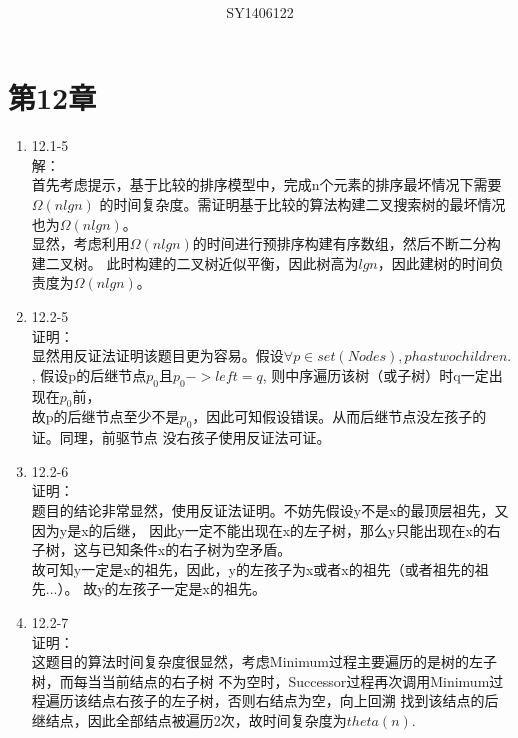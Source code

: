 \documentclass[UTF8]{ctexart}
\begin{document}
\title{\\}
\vspace{2cm}
\author{\\SY1406122}
\date{}
\maketitle

\section*{第12章}
\begin{enumerate}
    \item 12.1-5 \\
    解：\\
        首先考虑提示，基于比较的排序模型中，完成n个元素的排序最坏情况下需要$\Omega(nlgn)$
		的时间复杂度。需证明基于比较的算法构建二叉搜索树的最坏情况也为$\Omega(nlgn)$。\\
		显然，考虑利用$\Omega(nlgn)$的时间进行预排序构建有序数组，然后不断二分构建二叉树。
		此时构建的二叉树近似平衡，因此树高为$lgn$，因此建树的时间负责度为$\Omega(nlgn)$。\\
	
	\item 12.2-5 \\
	证明：\\
		显然用反证法证明该题目更为容易。假设$\forall p \in set(Nodes), p has two children.$,
		假设p的后继节点$p_0$且$p_0->left = q$, 则中序遍历该树（或子树）时q一定出现在$p_0$前，\\
		故p的后继节点至少不是$p_0$，因此可知假设错误。从而后继节点没左孩子的证。同理，前驱节点
		没右孩子使用反证法可证。

	\item 12.2-6 \\
	证明：\\
		题目的结论非常显然，使用反证法证明。不妨先假设y不是x的最顶层祖先，又因为y是x的后继，
		因此y一定不能出现在x的左子树，那么y只能出现在x的右子树，这与已知条件x的右子树为空矛盾。\\
		故可知y一定是x的祖先，因此，y的左孩子为x或者x的祖先（或者祖先的祖先...）。
		故y的左孩子一定是x的祖先。
		
	\item 12.2-7 \\
	证明：\\
		这题目的算法时间复杂度很显然，考虑Minimum过程主要遍历的是树的左子树，而每当当前结点的右子树
		不为空时，Successor过程再次调用Minimum过程遍历该结点右孩子的左子树，否则右结点为空，向上回溯
		找到该结点的后继结点，因此全部结点被遍历2次，故时间复杂度为$theta(n)$.
		

\end{enumerate}
\end{document}
